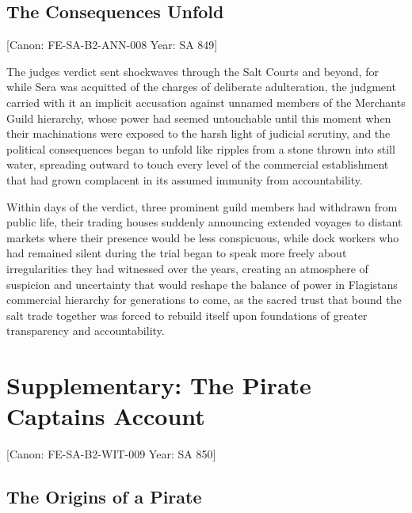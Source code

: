 \subsection{The Consequences Unfold}\label{the-consequences-unfold}

{[}Canon: FE-SA-B2-ANN-008 \textbar{} Year: SA 849{]}

The judge\textquotesingle s verdict sent shockwaves through the Salt
Courts and beyond, for while Sera was acquitted of the charges of
deliberate adulteration, the judgment carried with it an implicit
accusation against unnamed members of the Merchant\textquotesingle s
Guild hierarchy, whose power had seemed untouchable until this moment
when their machinations were exposed to the harsh light of judicial
scrutiny, and the political consequences began to unfold like ripples
from a stone thrown into still water, spreading outward to touch every
level of the commercial establishment that had grown complacent in its
assumed immunity from accountability.

Within days of the verdict, three prominent guild members had withdrawn
from public life, their trading houses suddenly announcing extended
voyages to distant markets where their presence would be less
conspicuous, while dock workers who had remained silent during the trial
began to speak more freely about irregularities they had witnessed over
the years, creating an atmosphere of suspicion and uncertainty that
would reshape the balance of power in Flagistan\textquotesingle s
commercial hierarchy for generations to come, as the sacred trust that
bound the salt trade together was forced to rebuild itself upon
foundations of greater transparency and accountability.

\section{Supplementary: The Pirate Captain\textquotesingle s
Account}\label{supplementary-the-pirate-captains-account}

{[}Canon: FE-SA-B2-WIT-009 \textbar{} Year: SA 850{]}

\subsection{The Origins of a Pirate}\label{the-origins-of-a-pirate}

